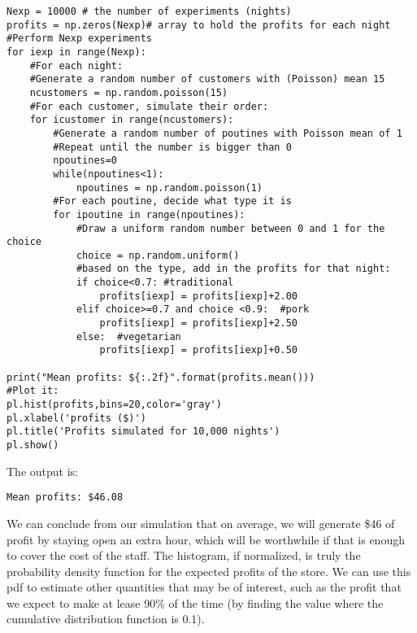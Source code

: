 \begin{lstlisting}[frame=single] 
Nexp = 10000 # the number of experiments (nights)
profits = np.zeros(Nexp)# array to hold the profits for each night
#Perform Nexp experiments
for iexp in range(Nexp):
    #For each night:
    #Generate a random number of customers with (Poisson) mean 15
    ncustomers = np.random.poisson(15)
    #For each customer, simulate their order:
    for icustomer in range(ncustomers):
        #Generate a random number of poutines with Poisson mean of 1
        #Repeat until the number is bigger than 0
        npoutines=0
        while(npoutines<1):
            npoutines = np.random.poisson(1)
        #For each poutine, decide what type it is
        for ipoutine in range(npoutines):
            #Draw a uniform random number between 0 and 1 for the choice
            choice = np.random.uniform()
            #based on the type, add in the profits for that night:
            if choice<0.7: #traditional
                profits[iexp] = profits[iexp]+2.00 
            elif choice>=0.7 and choice <0.9:  #pork
                profits[iexp] = profits[iexp]+2.50 
            else:  #vegetarian
                profits[iexp] = profits[iexp]+0.50
                
print("Mean profits: ${:.2f}".format(profits.mean())) 
#Plot it:
pl.hist(profits,bins=20,color='gray')
pl.xlabel('profits ($)')
pl.title('Profits simulated for 10,000 nights')
pl.show()
\end{lstlisting}
The output is:
\begin{verbatim}
Mean profits: $46.08
\end{verbatim}

We can conclude from our simulation that on average, we will generate \$46 of profit by staying open an extra hour, which will be worthwhile if that is enough to cover the cost of the staff. The histogram, if normalized, is truly the probability density function for the expected profits of the store. We can use this pdf to estimate other quantities that may be of interest, such as the profit that we expect to make at lease 90\% of the time (by finding the value where the cumulative distribution function is 0.1). 

